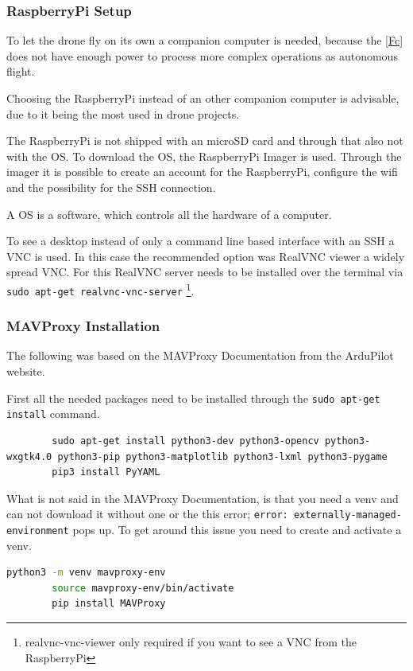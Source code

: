 \documentclass{article}
\begin{document}
	\subsubsection{RaspberryPi Setup}
	
	To let the drone fly on its own a companion computer is needed, because the \ref{Fc} does not have enough power to process more complex operations as autonomous flight.
	
	Choosing the RaspberryPi instead of an other companion computer is advisable, due to it being the most used in drone projects.
	
	The RaspberryPi is not shipped with an microSD card and through that also not with the \gls{OS}. To download the \gls{OS}, the RaspberryPi Imager is used. Through the imager it is possible to create an account for the RaspberryPi,  configure the wifi and the possibility for the \gls{SSH} connection. 
	\begin{Explanation}
		\item A \gls{OS} is a software, which controls all the hardware of a computer.
	\end{Explanation}
	
	To see a desktop instead of only a command line based interface with an \gls{SSH} a \gls{VNC} is used. In this case the recommended option was RealVNC viewer a widely spread \gls{VNC}. For this RealVNC server needs to be installed over the terminal via \lstinline|sudo apt-get realvnc-vnc-server| \cite{ionisvnctutorial}\footnote{realvnc-vnc-viewer only required if you want to see a VNC from the RaspberryPi}.
	
	\subsubsection{MAVProxy Installation}
	The following was based on the MAVProxy Documentation \cite{MavProxydocs} from the ArduPilot website.
	
	First all the needed packages need to be installed through the \lstinline|sudo apt-get install| command. 
	\begin{lstlisting}
		sudo apt-get install python3-dev python3-opencv python3-wxgtk4.0 python3-pip python3-matplotlib python3-lxml python3-pygame
		pip3 install PyYAML
	\end{lstlisting}
	What is not said in the MAVProxy Documentation, is that you need a \gls{venv} and can not download it without one or the this error; \lstinline|error: externally-managed-environment| pops up. To get around this issue you need to create and activate a \gls{venv}.
	\begin{lstlisting}[language=bash]
		python3 -m venv mavproxy-env
		source mavproxy-env/bin/activate
		pip install MAVProxy
	\end{lstlisting} 
	
\end{document}
